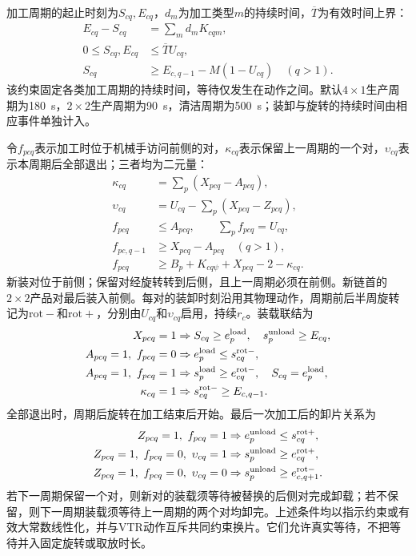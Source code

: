 \documentclass[final,5p,times,twocolumn]{elsarticle}
\begin{document}
加工周期的起止时刻为$S_{cq},E_{cq}$，$d_m$为加工类型$m$的持续时间，$\overline T$为有效时间上界：
\begin{equation}
\begin{aligned}
E_{cq}-S_{cq}&=\sum_m d_mK_{cqm},\\
0\le S_{cq},E_{cq}&\le\overline T U_{cq},\\
S_{cq}&\ge E_{c,q-1}-M(1-U_{cq})\quad(q>1).
\end{aligned}
\label{eq:cycle-time-cn}
\end{equation}
该约束固定各类加工周期的持续时间，等待仅发生在动作之间。默认$4\times1$生产周期为180~s，$2\times2$生产周期为90~s，清洁周期为500~s；装卸与旋转的持续时间由相应事件单独计入。

令$f_{pcq}$表示加工时位于机械手访问前侧的对，$\kappa_{cq}$表示保留上一周期的一个对，$\upsilon_{cq}$表示本周期后全部退出；三者均为二元量：
\begin{equation}
\begin{aligned}
\kappa_{cq}&=\sum_p(X_{pcq}-A_{pcq}),\\
\upsilon_{cq}&=U_{cq}-\sum_p(X_{pcq}-Z_{pcq}),\\
f_{pcq}&\le A_{pcq},\qquad\sum_pf_{pcq}=U_{cq},\\
f_{pc,q-1}&\ge X_{pcq}-A_{pcq}\quad(q>1),\\
f_{pcq}&\ge B_p+K_{cq\psi}+X_{pcq}-2-\kappa_{cq}.
\end{aligned}
\label{eq:cycle-side-cn}
\end{equation}
新装对位于前侧；保留对经旋转转到后侧，且上一周期必须在前侧。新链首的$2\times2$产品对最后装入前侧。每对的装卸时刻沿用其物理动作，周期前后半周旋转记为$\mathrm{rot-}$和$\mathrm{rot+}$，分别由$U_{cq}$和$\upsilon_{cq}$启用，持续$r_c$。装载联结为
\begin{equation}
\begin{aligned}
X_{pcq}=1&\Rightarrow S_{cq}\ge e^{\rm load}_p,\quad
s^{\rm unload}_p\ge E_{cq},\\
A_{pcq}=1,\ f_{pcq}=0&\Rightarrow e^{\rm load}_p\le s^{\rm rot-}_{cq},\\
A_{pcq}=1,\ f_{pcq}=1&\Rightarrow s^{\rm load}_p\ge e^{\rm rot-}_{cq},\quad
S_{cq}=e^{\rm load}_p,\\
\kappa_{cq}=1&\Rightarrow s^{\rm rot-}_{cq}\ge E_{c,q-1}.
\end{aligned}
\label{eq:cycle-load-cn}
\end{equation}
全部退出时，周期后旋转在加工结束后开始。最后一次加工后的卸片关系为
\begin{equation}
\begin{aligned}
Z_{pcq}=1,\ f_{pcq}=1&\Rightarrow e^{\rm unload}_p\le s^{\rm rot+}_{cq},\\
Z_{pcq}=1,\ f_{pcq}=0,\ \upsilon_{cq}=1
&\Rightarrow s^{\rm unload}_p\ge e^{\rm rot+}_{cq},\\
Z_{pcq}=1,\ f_{pcq}=0,\ \upsilon_{cq}=0
&\Rightarrow s^{\rm unload}_p\ge e^{\rm rot-}_{c,q+1}.
\end{aligned}
\label{eq:cycle-unload-cn}
\end{equation}
若下一周期保留一个对，则新对的装载须等待被替换的后侧对完成卸载；若不保留，则下一周期装载须等待上一周期的两个对均卸完。上述条件均以指示约束或有效大常数线性化，并与VTR动作互斥共同约束换片。它们允许真实等待，不把等待并入固定旋转或取放时长。
\end{document}
